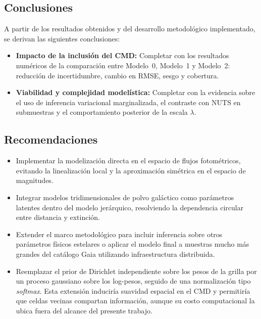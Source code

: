\documentclass[stu, 12pt, letterpaper, donotrepeattitle, floatsintext, natbib]{apa7_ula}
\begin{document}
\subsection{Conclusiones}
A partir de los resultados obtenidos y del desarrollo metodológico implementado, se derivan las siguientes conclusiones:
\begin{itemize}
    \item \textbf{Impacto de la inclusión del CMD:} Completar con los
    resultados numéricos de la comparación entre Modelo~0, Modelo~1 y
    Modelo~2: reducción de incertidumbre, cambio en RMSE, sesgo y
    cobertura.
    \item \textbf{Viabilidad y complejidad modelística:} Completar con
    la evidencia sobre el uso de inferencia variacional marginalizada,
    el contraste con NUTS en submuestras y el comportamiento posterior
    de la escala $\lambda$.
\end{itemize}

\subsection{Recomendaciones}
\begin{itemize}
    \item Implementar la modelización directa en el espacio de flujos fotométricos, evitando la linealización local y la aproximación simétrica en el espacio de magnitudes.
    \item Integrar modelos tridimensionales de polvo galáctico como parámetros latentes dentro del modelo jerárquico, resolviendo la dependencia circular entre distancia y extinción.
    \item Extender el marco metodológico para incluir inferencia sobre otros parámetros físicos estelares o aplicar el modelo final a muestras mucho más grandes del catálogo Gaia utilizando infraestructura distribuida.
    \item Reemplazar el prior de Dirichlet independiente sobre los
    pesos de la grilla por un proceso gaussiano sobre los log-pesos,
    seguido de una normalización tipo \textit{softmax}. Esta extensión
    induciría suavidad espacial en el CMD y permitiría que celdas
    vecinas compartan información, aunque su costo computacional la
    ubica fuera del alcance del presente trabajo.
\end{itemize}

\newpage
\renewcommand\refname{\large\textbf{Referencias Bibliográficas}}

\end{document}
